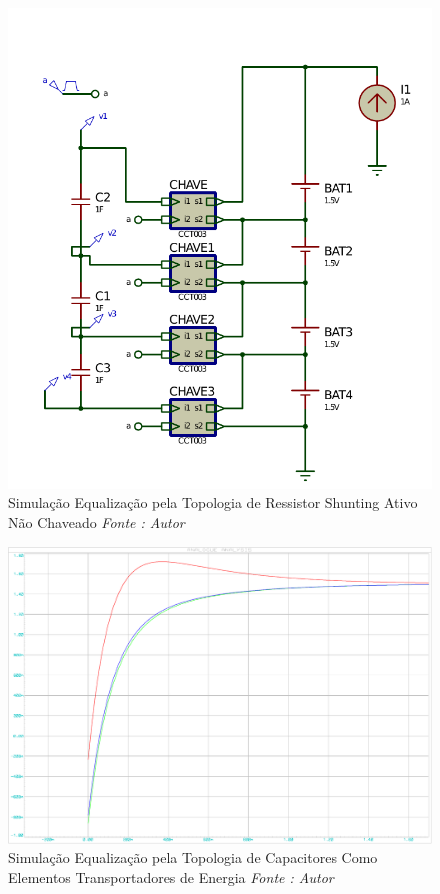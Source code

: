 \documentclass[11pt, a4paper, oneside]{article}
\begin{document}
\begin{figure}[h!]
\centering
\includegraphics[width=1\linewidth]{Equalizador_de_tensao_chaveado}
\caption{Simulação Equalização pela Topologia de Ressistor Shunting Ativo Não Chaveado \textit{Fonte : Autor}}
\label{fig:estrutura_equalizador_passivo_ apacitor}
\end{figure}

\begin{figure}[h!]
\centering
\includegraphics[width=1\linewidth]{Equalizador_de_te_sao_chaveado}
\caption{Simulação Equalização pela Topologia de Capacitores Como Elementos Transportadores de Energia \textit{Fonte : Autor}}
\label{fig:estrutura_equalizador_passivo_ apacitor}
\end{figure}
\end{document}
